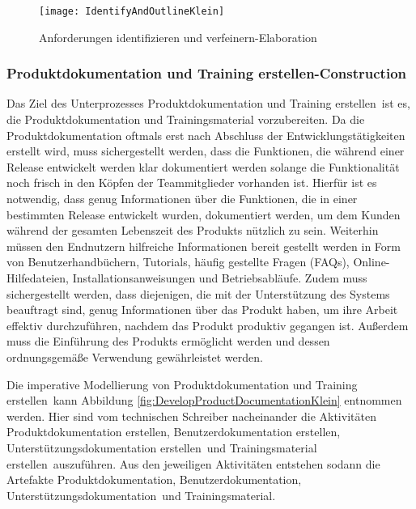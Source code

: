\begin{figure}[[!htbp]
\begin{center}
  \texttt{[image: IdentifyAndOutlineKlein]} %
  \caption{Anforderungen identifizieren und verfeinern-Elaboration}
  \label{fig:IdentifyAndOutlineKlein}
\end{center}
\end{figure}


\subsubsection{Produktdokumentation und Training erstellen-Construction}
 Das Ziel des Unterprozesses \grqq Produktdokumentation und Training erstellen\grqq \ ist es, die Produktdokumentation und Trainingsmaterial vorzubereiten. Da die Produktdokumentation oftmals erst nach Abschluss der Entwicklungstätigkeiten erstellt wird, muss sichergestellt werden, dass die Funktionen, die während einer Release entwickelt werden klar dokumentiert werden solange die Funktionalität noch frisch in den Köpfen der Teammitglieder vorhanden ist.\newline
 Hierfür ist es notwendig, dass genug Informationen über die Funktionen, die in einer bestimmten Release entwickelt wurden, dokumentiert werden, um dem Kunden während der gesamten Lebenszeit des Produkts nützlich zu sein.\newline
 Weiterhin müssen den Endnutzern hilfreiche Informationen bereit gestellt werden in Form von Benutzerhandbüchern, Tutorials, häufig gestellte Fragen (FAQs), Online-Hilfedateien, Installationsanweisungen und Betriebsabläufe. 
 Zudem muss sichergestellt werden, dass diejenigen, die mit der Unterstützung des Systems beauftragt sind, genug Informationen über das Produkt haben, um ihre Arbeit effektiv durchzuführen, nachdem das Produkt produktiv gegangen ist. Außerdem muss die Einführung des Produkts ermöglicht werden und dessen ordnungsgemäße Verwendung gewährleistet werden.\newline
 
 Die imperative Modellierung von \grqq Produktdokumentation und Training erstellen\grqq \ kann Abbildung \ref{fig:DevelopProductDocumentationKlein} entnommen werden.
 Hier sind vom technischen Schreiber nacheinander die Aktivitäten \grqq Produktdokumentation erstellen\grqq, \grqq Benutzerdokumentation erstellen\grqq, \grqq Unterstützungsdokumentation erstellen\grqq \ und \grqq Trainingsmaterial erstellen\grqq \ auszuführen. Aus den jeweiligen Aktivitäten entstehen sodann die Artefakte \grqq Produktdokumentation\grqq, \grqq Benutzerdokumentation\grqq, \grqq Unterstützungsdokumentation\grqq \ und \grqq Trainingsmaterial\grqq.
 
